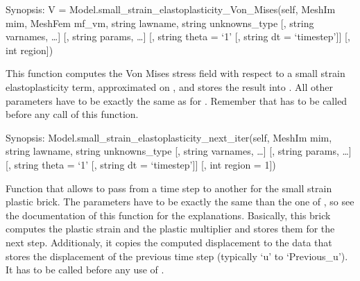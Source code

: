\documentclass[a4paper,11pt,english]{sphinxmanual}
\begin{document}
\begin{fulllineitems}

\begin{fulllineitems}
\label{\detokenize{python/cmdref_Model:getfem.Model.small_strain_elastoplasticity_Von_Mises}}
Synopsis: V = Model.small\_strain\_elastoplasticity\_Von\_Mises(self, MeshIm mim, MeshFem mf\_vm, string lawname, string unknowns\_type {[}, string varnames, …{]} {[}, string params, …{]} {[}, string theta = ‘1’ {[}, string dt = ‘timestep’{]}{]} {[}, int region{]})

This function computes the Von Mises stress field with respect to
a small strain elastoplasticity term, approximated on ,
and stores the result into .  All other parameters have to be
exactly the same as for .
Remember that  has to be called
before any call of this function.

\end{fulllineitems}


\begin{fulllineitems}
\label{\detokenize{python/cmdref_Model:getfem.Model.small_strain_elastoplasticity_next_iter}}
Synopsis: Model.small\_strain\_elastoplasticity\_next\_iter(self, MeshIm mim,  string lawname, string unknowns\_type {[}, string varnames, …{]} {[}, string params, …{]} {[}, string theta = ‘1’ {[}, string dt = ‘timestep’{]}{]} {[}, int region = \sphinxhyphen{}1{]})

Function that allows to pass from a time step to another for the
small strain plastic brick. The parameters have to be exactly the
same than the one of ,
so see the documentation of this function for the explanations.
Basically, this brick computes the plastic strain
and the plastic multiplier and stores them for the next step.
Additionaly, it copies the computed displacement to the data
that stores the displacement of the previous time step (typically
‘u’ to ‘Previous\_u’). It has to be called before any use of
.


\end{fulllineitems}
\end{fulllineitems}
\end{document}
